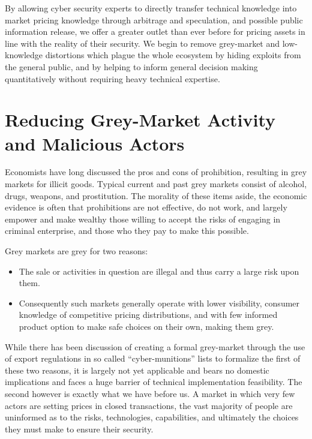 \documentclass[conference]{IEEEtran}
\begin{document}
By allowing cyber security experts to directly transfer technical knowledge into market pricing knowledge through arbitrage and speculation, and possible public information release, we offer a greater outlet than ever before for pricing assets in line with the reality of their security.   We begin to remove grey-market and low-knowledge distortions which plague the whole ecosystem by hiding exploits from the general public, and by helping to inform general decision making quantitatively without requiring heavy technical expertise.

\section{Reducing Grey-Market Activity and Malicious Actors}

Economists have long discussed the pros and cons of prohibition, resulting in grey markets for illicit goods.  Typical current and past grey markets consist of alcohol, drugs, weapons, and prostitution.   The morality of these items aside, the economic evidence is often that prohibitions are not effective, do not work, and largely empower and make wealthy those willing to accept the risks of engaging in criminal enterprise, and those who they pay to make this possible.   

Grey markets are grey for two reasons:

\begin{itemize}
 \item The sale or activities in question are illegal and thus carry a large risk upon them.
 \item Consequently such markets generally operate with lower visibility, consumer knowledge of competitive pricing distributions, and with few informed product option to make safe choices on their own, making them grey.
\end{itemize}

While there has been discussion of creating a formal grey-market through the use of export regulations in so called “cyber-munitions” lists to formalize the first of these two reasons, it is largely not yet applicable and bears no domestic implications and faces a huge barrier of technical implementation feasibility.
The second however is exactly what we have before us.   A market in which very few actors are setting prices in closed transactions, the vast majority of people are uninformed as to the risks, technologies, capabilities, and ultimately the choices they must make to ensure their security.
\end{document}
